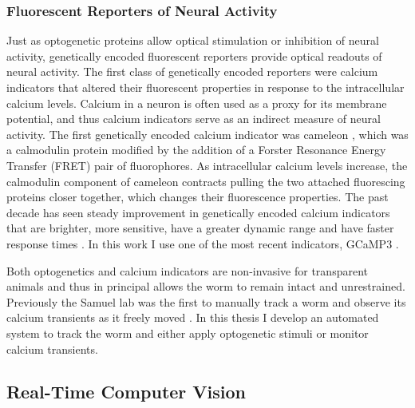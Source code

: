 \subsubsection{Fluorescent Reporters of Neural Activity}
Just as optogenetic proteins allow optical stimulation or inhibition of neural activity,  genetically encoded fluorescent reporters provide optical readouts of neural activity.  The first class of genetically encoded reporters were calcium indicators that altered their fluorescent properties in response to the intracellular calcium levels. Calcium in a neuron is often used as a proxy for its membrane potential, and thus calcium indicators serve as an indirect measure of neural activity.   The first genetically encoded calcium indicator was cameleon \citep{miyawaki_fluorescent_1997}, which was a calmodulin protein modified by the addition of a Forster Resonance Energy Transfer (FRET) pair of fluorophores. As intracellular calcium levels increase, the calmodulin component of  cameleon contracts pulling the two attached fluorescing proteins closer together, which changes their fluorescence properties. The past decade has seen  steady improvement in genetically encoded calcium indicators that are brighter, more sensitive, have a greater dynamic range and have faster response times \citep{miyawaki_innovations_2005,mank_genetically_2008,yamada_quantitative_2011}. In this work I use one of the most recent indicators, GCaMP3 \citep{tian_imaging_2009}.
 

Both optogenetics and calcium indicators are non-invasive for transparent animals and thus in principal allows the worm to remain intact and unrestrained. Previously the Samuel lab was the first to manually track a worm and observe its calcium transients as it freely moved \citep{clark_temporal_2007}. In this thesis I develop an automated system to track the worm and either apply optogenetic stimuli or monitor calcium transients.



\subsection{Real-Time Computer Vision}

